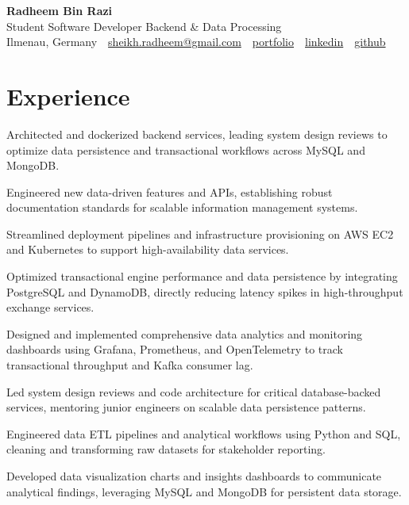 \documentclass[10pt,a4paper]{resume}
\makeatletter
\newcommand{\Portfolio}{https://radheem.github.io/my-cv}
\newcommand{\PortfolioText}{portfolio}
\newcommand{\GitHub}{https://github.com/radheem}
\newcommand{\LinkedIn}{https://www.linkedin.com/in/radheem-razi}
\newcommand{\Email}{sheikh.radheem@gmail.com}
\makeatother
\begin{document}
\begin{center}
  {\huge\bfseries Radheem Bin Razi}\\[3pt]
  {\large Student Software Developer Backend \& Data Processing}\\[6pt]
  \small
  Ilmenau, Germany \,\textbar\,
  \href{mailto:\Email}{\Email} \,\textbar\,
  \href{\Portfolio}{\PortfolioText} \,\textbar\,
  \href{\LinkedIn}{linkedin} \,\textbar\,
  \href{\GitHub}{github}
\end{center}
\vspace{2pt}

\section{Experience}

\bullets
  \item Architected and dockerized backend services, leading system design reviews to optimize data persistence and transactional workflows across MySQL and MongoDB.
  \item Engineered new data-driven features and APIs, establishing robust documentation standards for scalable information management systems.
  \item Streamlined deployment pipelines and infrastructure provisioning on AWS EC2 and Kubernetes to support high-availability data services.
\bulletsend
\vspace{1.5pt}
\bullets
  \item Optimized transactional engine performance and data persistence by integrating PostgreSQL and DynamoDB, directly reducing latency spikes in high-throughput exchange services.
  \item Designed and implemented comprehensive data analytics and monitoring dashboards using Grafana, Prometheus, and OpenTelemetry to track transactional throughput and Kafka consumer lag.
  \item Led system design reviews and code architecture for critical database-backed services, mentoring junior engineers on scalable data persistence patterns.
\bulletsend
\vspace{1.5pt}
\bullets
  \item Engineered data ETL pipelines and analytical workflows using Python and SQL, cleaning and transforming raw datasets for stakeholder reporting.
  \item Developed data visualization charts and insights dashboards to communicate analytical findings, leveraging MySQL and MongoDB for persistent data storage.
\bulletsend
\vspace{1.5pt}
\end{document}
